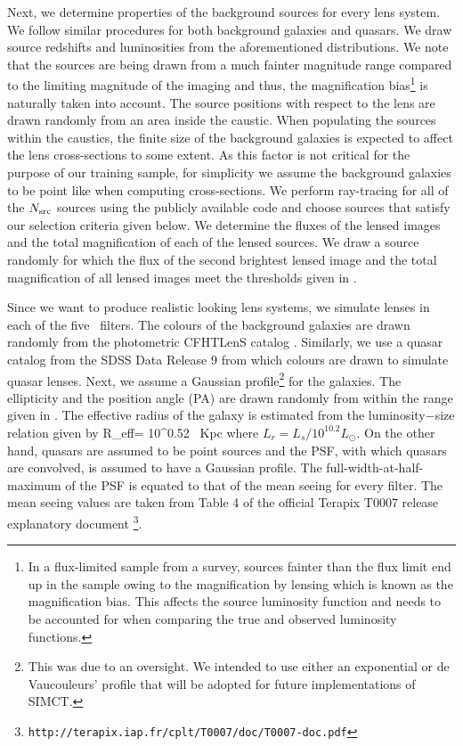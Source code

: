 \documentclass[useAMS,usenatbib,a4paper]{mn2e}
\begin{document}
Next, we determine properties of the background sources for every lens system.
We follow similar procedures for both background galaxies and quasars.
We draw source redshifts and luminosities from the aforementioned
distributions. We note that the sources are being drawn from a much
fainter magnitude range compared to the limiting magnitude of the
\cfhtls imaging and thus, the magnification bias\footnote{ In a
flux-limited sample from a survey, sources fainter than the flux limit
end up in the sample owing to the magnification by lensing which is
known as the magnification bias. This affects the source luminosity
function and needs to be accounted for when comparing the true and
observed luminosity functions.} is naturally taken into account. The
source positions with respect to the lens are drawn randomly from an
area inside the caustic.  When populating the sources within the
caustics, the finite size of the background galaxies is expected to
affect the lens cross-sections to some extent. As this factor is not
critical for the purpose of our training sample, for simplicity we assume the
background galaxies to be point like when computing cross-sections. We perform
ray-tracing for all of the $N_{\rm src}$ sources using the publicly
available code \gravlens \citep{Keeton2000} and choose sources that
satisfy our selection criteria given below. We determine the fluxes of the
lensed images and the total magnification of each of the lensed sources.
We draw a source randomly for which the flux of the second brightest
lensed image and the total magnification of all lensed images meet the
thresholds given in .

Since we want to produce realistic looking lens systems, we simulate
lenses in each of the five \cfhtls~filters. The colours of the background
galaxies are drawn randomly from the photometric CFHTLenS catalog
\citep{Hildebrandt2012,Erben2013}.  Similarly, we use a quasar catalog
from the SDSS Data Release 9 \citep{Paris2012} from which colours are
drawn to simulate quasar lenses. Next, we assume a Gaussian
profile\footnote{This was due to an oversight. We intended to use either
an exponential or de Vaucouleurs' profile that will be adopted for
future implementations of SIMCT.} for the galaxies. The ellipticity and
the position angle (PA) are drawn
randomly from within the range given in . The
effective radius of the galaxy is estimated from the luminosity$-$size
relation \citep[][with a redshift scaling, to account for size evolution]{Bernardi2003} given by
\be
R_{\rm eff}= 10^{0.52}  \, {\rm Kpc}
\ee
where $L_r=L_s/10^{10.2} L_\odot$. On the other hand, quasars are assumed to be
point sources and the PSF, with which quasars are convolved, is assumed
to have a Gaussian profile. The full-width-at-half-maximum of the PSF is
equated to that of the mean seeing for every filter. The mean seeing
values are taken from Table 4 of the official Terapix T0007 release
explanatory document \footnote{
\texttt{http://terapix.iap.fr/cplt/T0007/doc/T0007-doc.pdf}}.
\end{document}
